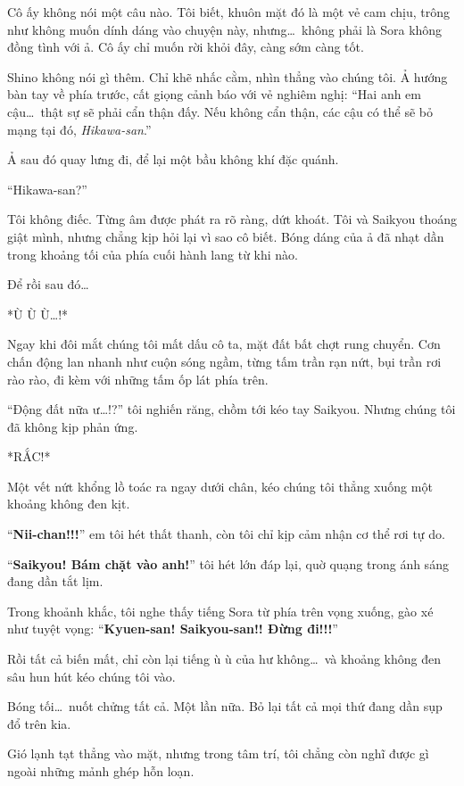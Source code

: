 \documentclass[../main.tex]{subfiles}
\begin{document}
Cô ấy không nói một câu nào. Tôi biết, khuôn mặt đó là một vẻ cam chịu, trông như không muốn dính dáng vào chuyện này, nhưng\dots\ không phải là Sora không đồng tình với ả. Cô ấy chỉ muốn rời khỏi đây, càng sớm càng tốt.

Shino không nói gì thêm. Chỉ khẽ nhấc cằm, nhìn thẳng vào chúng tôi. Ả hướng bàn tay về phía trước, cất giọng cảnh báo với vẻ nghiêm nghị: ``Hai anh em cậu\dots\ thật sự sẽ phải cẩn thận đấy. Nếu không cẩn thận, các cậu có thể sẽ bỏ mạng tại đó, \emph{Hikawa-san}.''


Ả sau đó quay lưng đi, để lại một bầu không khí đặc quánh.

``Hikawa-san?''

Tôi không điếc. Từng âm được phát ra rõ ràng, dứt khoát. Tôi và Saikyou thoáng giật mình, nhưng chẳng kịp hỏi lại vì sao cô biết. Bóng dáng của ả đã nhạt dần trong khoảng tối của phía cuối hành lang từ khi nào.

Để rồi sau đó\dots

*Ù Ù Ù\dots!*

Ngay khi đôi mắt chúng tôi mất dấu cô ta, mặt đất bất chợt rung chuyển. Cơn chấn động lan nhanh như cuộn sóng ngầm, từng tấm trần rạn nứt, bụi trần rơi rào rào, đi kèm với những tấm ốp lát phía trên.

``Động đất nữa ư\dots!?'' tôi nghiến răng, chồm tới kéo tay Saikyou. Nhưng chúng tôi đã không kịp phản ứng.

*RẮC!*

Một vết nứt khổng lồ toác ra ngay dưới chân, kéo chúng tôi thẳng xuống một khoảng không đen kịt.

``\textbf{Nii-chan!!!}'' em tôi hét thất thanh, còn tôi chỉ kịp cảm nhận cơ thể rơi tự do.

``\textbf{Saikyou! Bám chặt vào anh!}'' tôi hét lớn đáp lại, quờ quạng trong ánh sáng đang dần tắt lịm.

Trong khoảnh khắc, tôi nghe thấy tiếng Sora từ phía trên vọng xuống, gào xé như tuyệt vọng: ``\textbf{Kyuen-san! Saikyou-san!! Đừng đi!!!}''

Rồi tất cả biến mất, chỉ còn lại tiếng ù ù của hư không\dots\ và khoảng không đen sâu hun hút kéo chúng tôi vào.

Bóng tối\dots\ nuốt chửng tất cả. Một lần nữa. Bỏ lại tất cả mọi thứ đang dần sụp đổ trên kia.

Gió lạnh tạt thẳng vào mặt, nhưng trong tâm trí, tôi chẳng còn nghĩ được gì ngoài những mảnh ghép hỗn loạn.
\end{document}
